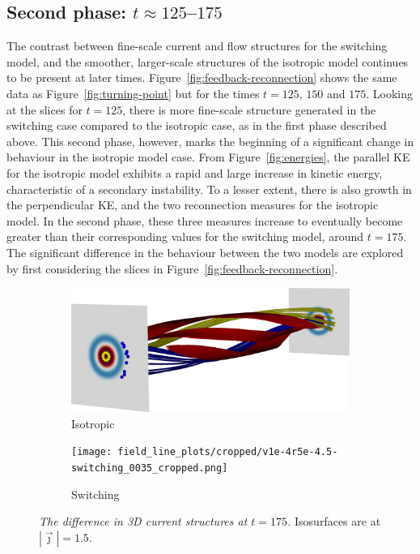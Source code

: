 \subsection{Second phase: $t\approx125$--$175$}
The contrast between fine-scale current and flow structures for the switching model, and the smoother, larger-scale structures of the isotropic model continues to be present at later times. Figure~\ref{fig:feedback-reconnection} shows the same data as Figure~\ref{fig:turning-point} but for the times $t=125$, $150$ and $175$. Looking at the slices for $t=125$, there is more fine-scale structure generated in the switching case compared to the isotropic case, as in the first phase described above. This second phase, however, marks the beginning of a significant change in behaviour in the isotropic model case. From Figure~\ref{fig:energies}, the parallel KE for the isotropic model exhibits a rapid and large increase in kinetic energy, characteristic of a secondary instability. To a lesser extent, there is also growth in the perpendicular KE, and the two reconnection measures for the isotropic model. In the second phase, these three measures increase to eventually become greater than their corresponding values for the switching model, around $t=175$. The significant difference in the behaviour between the two models are explored by first considering the slices in Figure~\ref{fig:feedback-reconnection}.

\begin{figure}[t]
  \centering
  \begin{subfigure}[b]{0.48\textwidth}
    \includegraphics[width=\linewidth]{field_line_plots/cropped/v1e-4r5e-4.5-isotropic_0035_cropped.png}
    \caption{Isotropic}
    \label{fig:reconnection-field-lines-iso}
  \end{subfigure}
  \begin{subfigure}[b]{0.48\textwidth}
    \texttt{[image: field\_line\_plots/cropped/v1e-4r5e-4.5-switching\_0035\_cropped.png]}
    \caption{Switching}
    \label{fig:reconnection-field-lines-swi}
  \end{subfigure}
  \caption{\textit{The difference in 3D current structures at $t=175$.} Isosurfaces are at $|\vec{\jmath}| = 1.5$.}
\label{fig:reconnection-field-lines}
\end{figure}


